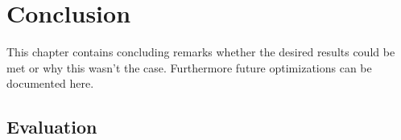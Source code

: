 \chapter{Conclusion}
\label{chap:conclusion}

This chapter contains concluding remarks whether the desired results could be met or why this wasn't the case.
Furthermore future optimizations can be documented here.

\section{Evaluation}
\label{sec:conclusion_evaluation}

